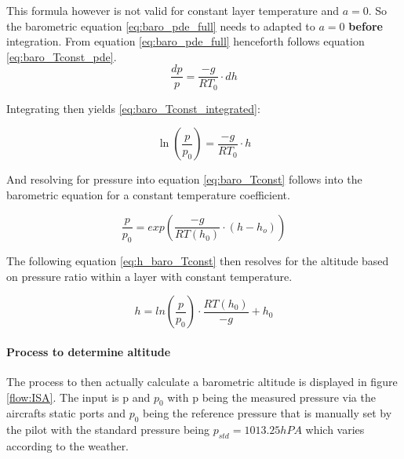 This formula however is not valid for constant layer temperature and $a=0$. So the barometric equation \ref{eq:baro_pde_full} needs to adapted to $a=0$ \textbf{before} integration. From equation \ref{eq:baro_pde_full} henceforth follows equation \ref{eq:baro_Tconst_pde}.
\begin{equation}
    \frac{dp}{p} = \frac{-g}{RT_0} \cdot dh
    \label{eq:baro_Tconst_pde}
\end{equation}

Integrating then yields \ref{eq:baro_Tconst_integrated}:

\begin{equation}
    \ln\left(\frac{p}{p_0}\right) = \frac{-g}{RT_0} \cdot h
    \label{eq:baro_Tconst_integrated}
\end{equation}

And resolving for pressure into equation \ref{eq:baro_Tconst} follows into the barometric equation for a constant temperature coefficient.

\begin{equation}
    \frac{p}{p_0}= exp\left(\frac{-g}{RT(h_0)}\cdot(h-h_o)\right)
    \label{eq:baro_Tconst}
\end{equation}


The following equation \ref{eq:h_baro_Tconst} then resolves for the altitude based on pressure ratio within a layer with constant temperature.


\begin{equation}
    h = ln(\frac{p}{p_0})\cdot \frac{RT(h_0)}{-g}+h_0
    \label{eq:h_baro_Tconst}
\end{equation}

\paragraph{Process to determine altitude}

The process to then actually calculate a barometric altitude is displayed in figure \ref{flow:ISA}. The input is p and $p_0$ with p being the measured pressure via the aircrafts static ports and $p_0$ being the reference pressure that is manually set by the pilot with the standard pressure being $p_{std} = 1013.25hPA$ which varies according to the weather.



